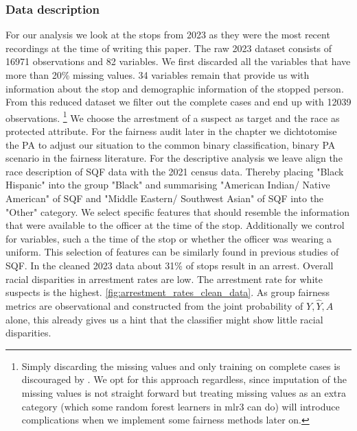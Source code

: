 \subsubsection*{Data description}
For our analysis we look at the stops from 2023 as they were the most recent recordings at the time of writing this paper. The raw 2023 dataset consists of 16971 observations and 82 variables. We first discarded all the variables that have more than 20\% missing values.
34 variables remain that provide us with information about the stop and demographic information of the stopped person. From this reduced dataset we filter out the complete cases and end up with 12039 observations.
\footnote{Simply discarding the missing values and only training on complete cases is discouraged by \cite{fernando2021}. We opt for this approach regardless, since imputation of the missing values is not straight forward
but treating missing values as an extra category (which some random forest learners in mlr3 can do) will introduce complications when we implement some fairness methods later on.}
We choose the arrestment of a suspect as target and the race as protected attribute. For the fairness audit later in the chapter we dichtotomise the PA to adjust our situation to the common binary classification, binary PA scenario in the fairness literature. For the descriptive analysis we leave align the race description of SQF data with the 2021 census data. Thereby placing "Black Hispanic" into the group "Black" and summarising "American Indian/ Native American" of SQF and "Middle Eastern/ Southwest Asian" of SQF into the "Other" category.  
We select specific features that should resemble the information that were available to the officer at the time of the stop. Additionally we control for variables, such a the time of the stop or whether the officer was wearing a uniform. This selection of features can be similarly found in previous studies of SQF.
In the cleaned 2023 data about 31\% of stops result in an arrest. Overall racial disparities in arrestment rates are low. The arrestment rate for white suspects is the highest. \autoref{fig:arrestment_rates_clean_data}. As group fairness metrics are observational and constructed from the joint probability of $Y, \hat{Y}, A$ alone, this already gives us a hint that the classifier might show little racial disparities.


